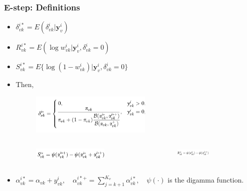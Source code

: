 \documentclass{beamer}
\begin{document}


\begin{frame}
\frametitle{E-step: Definitions}
\begin{itemize}
  \item $\delta_{vk}^{i*} = E(\delta_{vk}^i|\boldsymbol{y}_v^i)$
  \item $R_{vk}^{i*} = E(\log w_{vk}^i|\boldsymbol{y}_v^i, \delta_{vk}^i = 0)$
  \item $S_{vk}^{i*} = E\{\log(1 - w_{vk}^i)|\boldsymbol{y}_{v}^i, \delta_{vk}^i = 0\}$
  \item Then,
\begin{figure}[!htb]
	\centering
	\includegraphics[width=0.55\textwidth]{img/deltastar.png}
\end{figure}


\begin{columns}[c]
  \begin{figure}[!htb]
	\centering
	\includegraphics[width=0.75\textwidth]{img/sstar.png}
\end{figure}
  \begin{figure}[!htb]
  	\includegraphics[width=0.55\textwidth]{img/rstar.png}
  \end{figure}
\end{columns}
\item $\alpha_{vk}^{i*} = \alpha_{vk} + y_{vk}^i,\quad  \alpha_{vk}^{i*+} = \sum_{j = k+1}^{K_v}\alpha_{vk}^{i*}, \quad \psi(\cdot)$ is the digamma function.

\end{itemize}
\end{frame}
\end{document}
